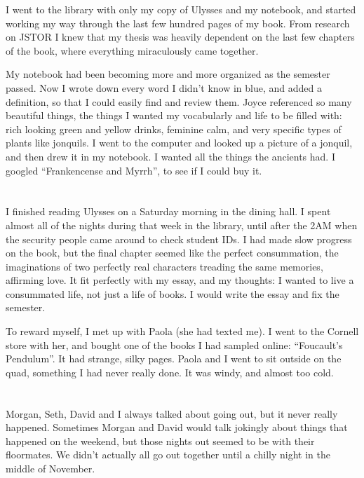 I went to the library with only my copy of Ulysses and my notebook, and started
working my way through the last few hundred pages of my book.  From research on
JSTOR I knew that my thesis was heavily dependent on the last few chapters of
the book, where everything miraculously came together.

My notebook had been becoming more and more organized as the semester passed.
Now I wrote down every word I didn't know in blue, and added a definition, so
that I could easily find and review them.  Joyce referenced so many beautiful
things, the things I wanted my vocabularly and life to be filled with: rich
looking green and yellow drinks, feminine calm, and very specific types of
plants like jonquils.  I went to the computer and looked up a picture of a
jonquil, and then drew it in my notebook.  I wanted all the things the ancients
had.  I googled ``Frankencense and Myrrh'', to see if I could buy it.


\section{}

I finished reading Ulysses on a Saturday morning in the dining hall.   I spent
almost all of the nights during that week in the library, until after the 2AM
when the security people came around to check student IDs.  I had made slow
progress on the book, but the final chapter seemed like the perfect
consummation, the imaginations of two perfectly real characters treading the
same memories, affirming love.  It fit perfectly with my essay, and my thoughts:
I wanted to live a consummated life, not just a life of books.  I would write
the essay and fix the semester.

To reward myself, I met up with Paola (she had texted me).  I went to the Cornell
store with her, and bought one of the books I had sampled online: ``Foucault's
Pendulum''.  It had strange, silky pages.  Paola and I went to sit outside on
the quad, something I had never really done.  It was windy, and almost too cold.


\section{}

Morgan, Seth, David and I always talked about going out, but it never really
happened.  Sometimes Morgan and David would talk jokingly about things that
happened on the weekend, but those nights out seemed to be with their
floormates.  We didn't actually all go out together until a chilly night in the
middle of November.  

